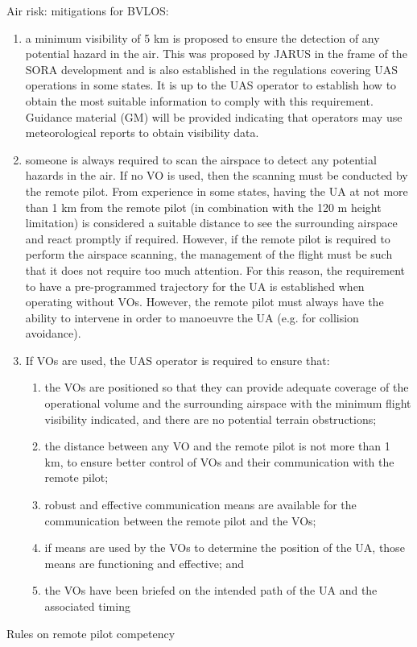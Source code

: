 \documentclass{ua_wgs_base}
\begin{document}
Air risk: mitigations for BVLOS:
\begin{enumerate}
\item a minimum visibility of 5 km is proposed to ensure the detection of
any potential hazard in the air. This was proposed by JARUS in the
frame of the SORA development and is also established in the regulations
covering UAS operations in some states. It is up to the UAS operator
to establish how to obtain the most suitable information to comply
with this requirement. Guidance material (GM) will be provided indicating
that operators may use meteorological reports to obtain visibility
data.
\item someone is always required to scan the airspace to detect any potential
hazards in the air. If no VO is used, then the scanning must be conducted
by the remote pilot. From experience in some states, having the UA
at not more than 1 km from the remote pilot (in combination with the
120 m height limitation) is considered a suitable distance to see
the surrounding airspace and react promptly if required. However,
if the remote pilot is required to perform the airspace scanning,
the management of the flight must be such that it does not require
too much attention. For this reason, the requirement to have a pre-programmed
trajectory for the UA is established when operating without VOs. However,
the remote pilot must always have the ability to intervene in order
to manoeuvre the UA (e.g. for collision avoidance).
\item If VOs are used, the UAS operator is required to ensure that: 
\begin{enumerate}
\item the VOs are positioned so that they can provide adequate coverage
of the operational volume and the surrounding airspace with the minimum
flight visibility indicated, and there are no potential terrain obstructions;
\item the distance between any VO and the remote pilot is not more than
1 km, to ensure better control of VOs and their communication with
the remote pilot; 
\item robust and effective communication means are available for the communication
between the remote pilot and the VOs;
\item if means are used by the VOs to determine the position of the UA,
those means are functioning and effective; and 
\item the VOs have been briefed on the intended path of the UA and the associated
timing
\end{enumerate}
\end{enumerate}
Rules on remote pilot competency 
\end{document}
